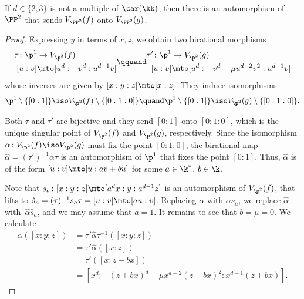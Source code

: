 \begin{remark}
If $d \in \{2, 3\}$ is not a multiple of $\car(\kk)$, then
there is an automorphism of $\PP^2$ that sends $V_{\PP^2}(f)$ onto $V_{\PP^2}(g)$.
\end{remark}

\begin{proof}
Expressing $y$ in terms of $x,z$, we obtain two birational morphisms
\[
\begin{aligned}
\tau\colon \p^1 & \to V_{\p^2}(f)\\
 {[u:v]} & \mto [u^d:-v^d:u^{d-1}v]
\end{aligned}\qquand
\begin{aligned}
\tau'\colon \p^1 & \to V_{\p^2}(g)\\
{[u:v]} & \mto [u^d:-v^d-\mu u^{d-2}v^2:u^{d-1}v]
\end{aligned}
\]
whose inverses are given by $[x:y:z]\mto [x:z]$. They induce isomorphisms
\[
\p^1\setminus \{[0:1]\}\iso V_{\p^2}(f)\setminus \{[0:1:0]\}\quand\p^1\setminus \{[0:1]\}\iso V_{\p^2}(g)\setminus \{[0:1:0]\}.
\]

Both $\tau$ and $\tau'$ are bijective and they send $[0:1]$ onto $[0:1:0]$, which is the unique singular point of $V_{\p^{2}}(f)$ and $V_{\p^{2}}(g)$,
respectively. Since the isomorphism $\alpha\colon V_{\p^{2}}(f)\iso V_{\p^{2}}(g)$ must fix the point $[0:1:0]$, the birational map $\hat\alpha=(\tau')^{-1}\alpha\tau$ is an automorphism of $\p^1$ that fixes the point $[0:1]$. Thus, $\hat\alpha$ is of the form $[u:v]\mto [u:av+bu]$ for some $a\in \k^*$, $b\in \k$.

Note that $s_a\colon [x:y:z]\mto [a^d x:y:a^{d-1} z]$ is an automorphism of $V_{\p^2}(f)$, that lifts to $\hat s_a=(\tau)^{-1}s_a\tau=[u:v]\mto [a u:v]$. Replacing $\alpha$ with $\alpha s_a$, we replace $\hat\alpha$ with~$\hat\alpha \hat s_a$,
and we may assume that $a=1$. It remains to see that $b=\mu=0$.
We calculate
\begin{align*}
\alpha( [x:y:z]) &= \tau' \hat\alpha \tau^{-1}( [x:y:z])\\
&= \tau' \hat\alpha([x:z]) \\
&= \tau' ([x:z+bx]) \\
&= [x^d:-(z+bx)^d-\mu x^{d-2}(z+bx)^2:x^{d-1}(z+bx)].
\end{align*}


\end{proof}
